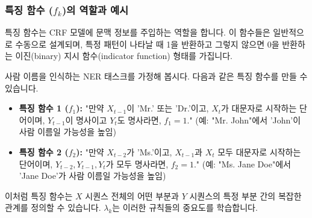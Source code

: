 \documentclass[11pt,a4paper]{article}
\theoremstyle{definition}
\begin{document}
\subsubsection{특징 함수 ($f_k$)의 역할과 예시}
특징 함수는 CRF 모델에 문맥 정보를 주입하는 역할을 합니다. 이 함수들은 일반적으로 수동으로 설계되며, 특정 패턴이 나타날 때 1을 반환하고 그렇지 않으면 0을 반환하는 이진(binary) 지시 함수(indicator function) 형태를 가집니다.

\begin{examplebox}[title=CRF 특징 함수 예시: 사람 이름 인식]
사람 이름을 인식하는 NER 태스크를 가정해 봅시다. 다음과 같은 특징 함수를 만들 수 있습니다.

\begin{itemize}
    \item \textbf{특징 함수 1 ($f_1$):}
    "만약 $X_{t-1}$이 'Mr.' 또는 'Dr.'이고, $X_t$가 대문자로 시작하는 단어이며, $Y_{t-1}$이 명사이고 $Y_t$도 명사라면, $f_1 = 1$."
    (예: "Mr. John"에서 'John'이 사람 이름일 가능성을 높임)

    \item \textbf{특징 함수 2 ($f_2$):}
    "만약 $X_{t-2}$가 'Ms.'이고, $X_{t-1}$과 $X_t$ 모두 대문자로 시작하는 단어이며, $Y_{t-2}, Y_{t-1}, Y_t$가 모두 명사라면, $f_2 = 1$."
    (예: "Ms. Jane Doe"에서 'Jane Doe'가 사람 이름일 가능성을 높임)
\end{itemize}
이처럼 특징 함수는 $X$ 시퀀스 전체의 어떤 부분과 $Y$ 시퀀스의 특정 부분 간의 복잡한 관계를 정의할 수 있습니다. $\lambda_k$는 이러한 규칙들의 중요도를 학습합니다.
\end{examplebox}
\end{document}
